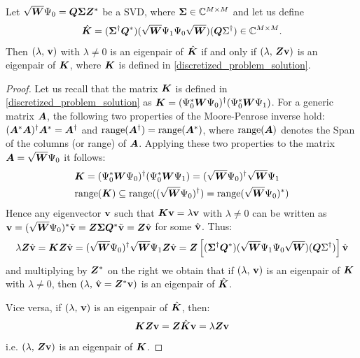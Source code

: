 \begin{prop}
\label{prop_kedmd}
Let $\sqrt{\vb*{W}}\Psi_0 = \vb*{Q}\vb*{\Sigma}\vb*{Z}^*$ be a SVD, where $\vb*{\Sigma}\in\mathbb{C}^{M\times M}$ and let us define
\begin{equation}
    \label{kedmd_matrix}
    \hat{\vb*{K}} = (\vb*{\Sigma}^{\dagger}\vb*{Q}^*)(\sqrt{\vb*{W}}\Psi_1\Psi_0\sqrt{\vb*{W}})(\vb*{Q}\Sigma^{\dagger})\in\mathbb{C}^{M \times M}.
\end{equation}
Then $(\lambda,\,\vb{v})$ with $\lambda\neq 0$ is an eigenpair of $\hat{\vb*{K}}$ if and only if $(\lambda,\,\vb*{Z}\vb{v})$ is an eigenpair of $\vb*{K}$, where $\vb*{K}$ is defined in \eqref{discretized_problem_solution}.
\end{prop}
\begin{proof}
Let us recall that the matrix $\vb*{K}$ is defined in \eqref{discretized_problem_solution} as $\vb*{K} = (\Psi_0^*\vb*{W}\Psi_0)^{\dagger}(\Psi_0^*\vb*{W}\Psi_1)$. For a generic matrix $\vb*{A}$, the following two properties of the Moore-Penrose inverse hold: $(\vb*{A}^*\vb*{A})^{\dagger}\vb*{A}^* = \vb*{A}^{\dagger}$ and $\mathrm{range}(\vb*{A}^{\dagger}) = \mathrm{range}(\vb*{A}^*)$, where $\mathrm{range}(\vb*{A})$ denotes the Span of the columns (or range) of $\vb*{A}$. Applying these two properties to the matrix $\vb*{A} = \sqrt{\vb*{W}}\Psi_0$ it follows: 
\begin{equation*}
    \begin{split}
        &\vb*{K} = (\Psi_0^*\vb*{W}\Psi_0)^{\dagger}(\Psi_0^*\vb*{W}\Psi_1) = (\sqrt{\vb*{W}}\Psi_0)^{\dagger} \sqrt{\vb*{W}}\Psi_1 \\
        &\mathrm{range}(\vb*{K}) \subseteq \mathrm{range}((\sqrt{\vb*{W}}\Psi_0)^{\dagger}) = \mathrm{range}(\sqrt{\vb*{W}}\Psi_0)^*)
    \end{split}
\end{equation*}
Hence any eigenvector $\vb{v}$ such that $\vb*{K}\vb{v} = \lambda \vb{v}$ with $\lambda \neq 0$ can be written as $\vb{v} = (\sqrt{\vb*{W}}\Psi_0)^*\tilde{\vb{v}} = \vb*{Z}\vb*{\Sigma}\vb*{Q}^*\tilde{\vb{v}} = \vb*{Z}\hat{\vb{v}}$ for some $\hat{\vb{v}}$. Thus:
\begin{equation*}
    \lambda \vb*{Z}\hat{\vb{v}} = \vb*{K}\vb*{Z}\hat{\vb{v}} = (\sqrt{\vb*{W}}\Psi_0)^{\dagger} \sqrt{\vb*{W}}\Psi_1 \vb*{Z}\hat{\vb{v}} = \vb*{Z}\left[(\vb*{\Sigma}^{\dagger}\vb*{Q}^*)(\sqrt{\vb*{W}}\Psi_1\Psi_0\sqrt{\vb*{W}})(\vb*{Q}\Sigma^{\dagger})\right] \hat{\vb{v}}
\end{equation*}
and multiplying by $\vb*{Z}^*$ on the right we obtain that if $(\lambda,\,\vb{v})$ is an eigenpair of $\vb*{K}$ with $\lambda\neq 0$, then $(\lambda,\,\hat{\vb{v}} = \vb*{Z}^*\vb{v})$ is an eigenpair of $\hat{\vb*{K}}$. 

Vice versa, if $(\lambda,\,\vb{v})$ is an eigenpair of $\hat{\vb*{K}}$, then:
\begin{equation*}
    \vb*{K}\vb*{Z}\vb{v} = \vb*{Z}\hat{\vb*{K}}\vb{v} = \lambda\vb*{Z}\vb{v}
\end{equation*}
i.e. $(\lambda,\,\vb*{Z}\vb{v})$ is an eigenpair of $\vb*{K}$.
\end{proof}

